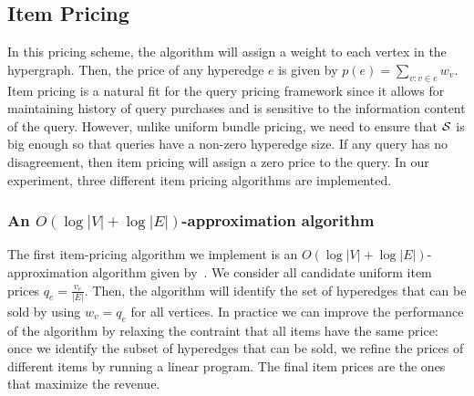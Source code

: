 %


\subsection{Item Pricing} 

In this pricing scheme, the algorithm will assign a weight to each vertex in the hypergraph. Then, the price of any hyperedge $e$ is given by $p(e) = \sum_{v : v \in e} w_v$. Item pricing is a natural fit for the query pricing framework since it allows for maintaining history of query purchases and is sensitive to the information content of the query. However, unlike uniform bundle pricing, we need to ensure that $\mathcal{S}$ is big enough so that queries have a non-zero hyperedge size. If any query has no disagreement, then item pricing will assign a zero price to the query. In our experiment, three different item pricing algorithms are implemented.

\subsubsection{An $O(\log |V|+\log |E|)$-approximation algorithm}

The first item-pricing algorithm we implement is an $O(\log |V| + \log |E|)$-approximation algorithm given by~\cite{guruswami2005profit}. We consider all candidate uniform item prices $q_e = \frac{v_e}{|E|}$. Then, the algorithm will identify the set of hyperedges that can be sold by using $w_v = q_e$ for all vertices. In practice we can improve the performance of the algorithm by relaxing the contraint that all items have the same price: once we identify the subset of hyperedges that can be sold, we refine the prices of different items by running a linear program. The final item prices are the ones that maximize the revenue. 

